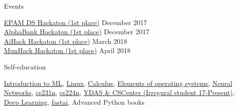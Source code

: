 \documentclass{resume} %
\begin{document}
\vspace{-1.8\baselineskip}
\begin{rSection}{Events}
\vspace{-0.7\baselineskip}

\begin{footnotesize}
\begin{multicols}{2}
\href{https://events.epam.com/events/data-science-hackathon}{EPAM DS Hackaton (1st place)} \hfill December 2017 \\
\href{http://1.changellenge.com/nightpython}{AlphaBank Hackaton (1st place)} \hfill December 2017 \\
\href{http://aihack.ai-hub.ru/}{AiHack Hackaton (1st place)} \hfill March 2018 \\
\href{http://munhack.ru/}{MunHack Hackaton (1st place)} \hfill April 2018
\end{multicols}
\end{footnotesize}

\end{rSection} 
\vspace{-1.5\baselineskip}
\begin{rSection}{Self-education}
\vspace{-0.3\baselineskip}

\begin{footnotesize}
\href{https://www.coursera.org/learn/vvedenie-mashinnoe-obuchenie}{Introduction to ML}, \href{https://stepik.org/course/73}{Linux}, \href{https://stepik.org/course/95}{Calculus}, \href{https://stepik.org/course/253}{Elements of operating systems}, \href{https://stepik.org/course/401/}{Neural Networks}, \href{http://cs231n.stanford.edu/}{cs231n}, \href{http://web.stanford.edu/class/cs224n/}{cs224n}, \href{https://yandexdataschool.ru}{YDAS \& CSCenter (Irregural student 17-Present)}, \href{https://www.deeplearningbook.org}{Deep Learning}, \href{http://course.fast.ai}{fastai}, Advanced Python books
\end{footnotesize}

\end{rSection} 
\end{document}
